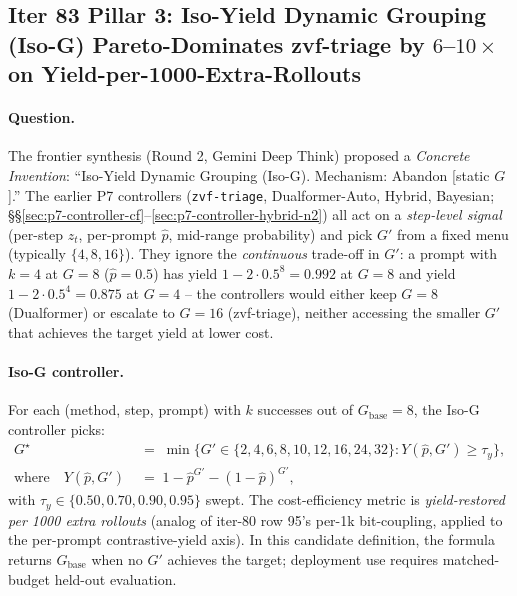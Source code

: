 \subsection{Iter 83 Pillar 3: Iso-Yield Dynamic Grouping (Iso-G)
              Pareto-Dominates zvf-triage by $6$--$10\times$ on
              Yield-per-1000-Extra-Rollouts}
\label{sec:p7-iter83-iso-g}

\paragraph{Question.}
The frontier synthesis (Round 2, Gemini Deep Think) proposed a
\emph{Concrete Invention}: ``Iso-Yield Dynamic Grouping (Iso-G).
Mechanism: Abandon [static $G$].''  The earlier P7 controllers
(\texttt{zvf-triage}, Dualformer-Auto, Hybrid, Bayesian;
\S\S\ref{sec:p7-controller-cf}--\ref{sec:p7-controller-hybrid-n2})
all act on a \emph{step-level signal} (per-step $z_t$, per-prompt
$\hat p$, mid-range probability) and pick $G'$ from a fixed menu
(typically $\{4, 8, 16\}$).  They ignore the \emph{continuous}
trade-off in $G'$: a prompt with $k{=}4$ at $G{=}8$ ($\hat p = 0.5$)
has yield $1 - 2 \cdot 0.5^8 = 0.992$ at $G{=}8$ and yield
$1 - 2 \cdot 0.5^4 = 0.875$ at $G{=}4$ -- the controllers would either
keep $G{=}8$ (Dualformer) or escalate to $G{=}16$ (zvf-triage),
neither accessing the smaller $G'$ that achieves the
target yield at lower cost.

\paragraph{Iso-G controller.}
For each (method, step, prompt) with $k$ successes out of
$G_{\text{base}}{=}8$, the Iso-G controller picks:
\begin{align}
G^\star &\;=\; \min\bigl\{G' \in \{2,4,6,8,10,12,16,24,32\} : Y(\hat p, G') \ge \tau_y\bigr\}, \label{eq:p7-iso-g} \\
\text{where}\quad Y(\hat p, G') &\;=\; 1 - \hat p^{G'} - (1-\hat p)^{G'}, \nonumber
\end{align}
with $\tau_y \in \{0.50, 0.70, 0.90, 0.95\}$ swept.  The cost-efficiency
metric is \emph{yield-restored per 1000 extra rollouts} (analog of
iter-80 row 95's per-1k bit-coupling, applied to the per-prompt
contrastive-yield axis).  In this candidate definition, the formula returns
$G_{\text{base}}$ when no $G'$ achieves the target; deployment use requires
matched-budget held-out evaluation.


